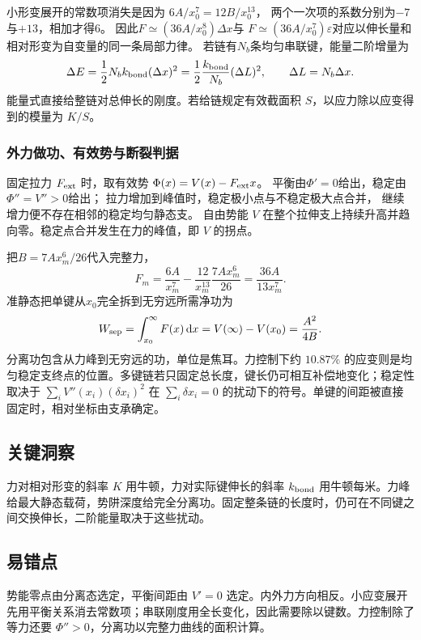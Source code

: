 \documentclass[UTF8,fontset=fandol,a4paper,11pt]{ctexart}
\newcommand{\dd}{\mathop{}\!\mathrm{d}}
\begin{document}
小形变展开的常数项消失是因为
$6A/x_0^7=12B/x_0^{13}$，
两个一次项的系数分别为$-7$与$+13$，相加才得6。
因此$F\simeq(36A/x_0^8)\Delta x$与
$F\simeq(36A/x_0^7)\varepsilon$对应以伸长量和相对形变为自变量的同一条局部力律。
若链有$N_b$条均匀串联键，能量二阶增量为
\[
\Delta E=\frac12N_b k_{\rm bond}(\Delta x)^2
=\frac12\frac{k_{\rm bond}}{N_b}(\Delta L)^2,
\qquad\Delta L=N_b\Delta x.
\]
能量式直接给整链对总伸长的刚度。若给链规定有效截面积 $S$，以应力除以应变得到的模量为 $K/S$。

\subsubsection*{外力做功、有效势与断裂判据}
固定拉力 $F_{\rm ext}$ 时，取有效势
$\Phi(x)=V(x)-F_{\rm ext}x$。
平衡由$\Phi'=0$给出，稳定由$\Phi''=V''>0$给出；
拉力增加到峰值时，稳定极小点与不稳定极大点合并，
继续增力便不存在相邻的稳定均匀静态支。
自由势能 $V$ 在整个拉伸支上持续升高并趋向零。稳定点合并发生在力的峰值，即 $V$ 的拐点。

把$B=7Ax_m^6/26$代入完整力，
\[
F_m=\frac{6A}{x_m^7}-\frac{12}{x_m^{13}}\frac{7Ax_m^6}{26}
=\frac{36A}{13x_m^7}.
\]
准静态把单键从$x_0$完全拆到无穷远所需净功为
\[
W_{\rm sep}=\int_{x_0}^{\infty}F(x)\dd x
=V(\infty)-V(x_0)=\frac{A^2}{4B}.
\]
分离功包含从力峰到无穷远的功，单位是焦耳。力控制下约 $10.87\%$ 的应变则是均匀稳定支终点的位置。多键链若只固定总长度，键长仍可相互补偿地变化；稳定性取决于 $\sum_i V''(x_i)(\delta x_i)^2$ 在 $\sum_i\delta x_i=0$ 的扰动下的符号。单键的间距被直接固定时，相对坐标由支承确定。




\subsection*{关键洞察}

力对相对形变的斜率 $K$ 用牛顿，力对实际键伸长的斜率 $k_{\rm bond}$ 用牛顿每米。力峰给最大静态载荷，势阱深度给完全分离功。固定整条链的长度时，仍可在不同键之间交换伸长，二阶能量取决于这些扰动。



\subsection*{易错点}

势能零点由分离态选定，平衡间距由 $V'=0$ 选定。内外力方向相反。小应变展开先用平衡关系消去常数项；串联刚度用全长变化，因此需要除以键数。力控制除了等力还要 $\Phi''>0$，分离功以完整力曲线的面积计算。
\end{document}

